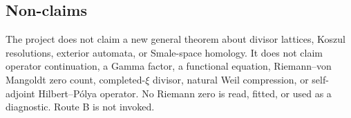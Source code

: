 \subsection{Non-claims}

The project does not claim a new general theorem about divisor lattices,
Koszul resolutions, exterior automata, or Smale-space homology. It does not
claim operator continuation, a Gamma factor, a functional equation,
Riemann--von Mangoldt zero count, completed-$\xi$ divisor, natural Weil
compression, or self-adjoint Hilbert--P\'olya operator. No Riemann zero is
read, fitted, or used as a diagnostic. Route B is not invoked.
